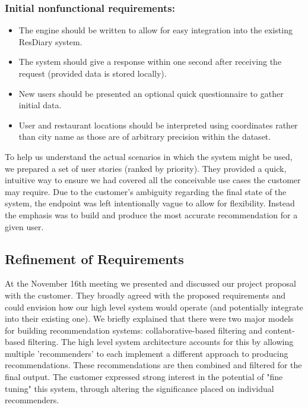 \documentclass{l3proj}
\begin{document}
\subsubsection{Initial nonfunctional requirements:}
\begin{itemize}
\item The engine should be written to allow for easy integration into the existing ResDiary system.
\item The system should give a response within one second after receiving the request (provided data is stored locally).
\item New users should be presented an optional quick questionnaire to gather initial data.
\item User and restaurant locations should be interpreted using coordinates rather than city name as those are of arbitrary precision within the dataset.
\end{itemize}

To help us understand the actual scenarios in which the system might be used, we prepared a set of user stories (ranked by priority). They provided a quick, intuitive way to ensure we had covered all the conceivable use cases the customer may require.
Due to the customer's ambiguity regarding the final state of the system, the endpoint was left intentionally vague to allow for flexibility. Instead the emphasis was to build and produce the most accurate recommendation for a given user. 


\subsection{Refinement of Requirements}
\label{sec:custrefineinitobj}

At the November 16th meeting we presented and discussed our project proposal with the customer. They broadly agreed with the proposed requirements and could envision how our high level system would operate (and potentially integrate into their existing one). We briefly explained that there were two major models for building recommendation systems: collaborative-based filtering and content-based filtering. The high level system architecture accounts for this by allowing multiple 'recommenders' to each implement a different approach to producing recommendations. These recommendations are then combined and filtered for the final output. The customer expressed strong interest in the potential of "fine tuning" this system, through altering the significance placed on individual recommenders. 
\end{document}
